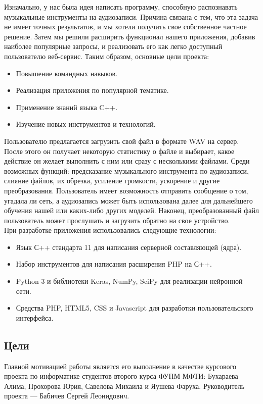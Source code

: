 \documentclass[14pt,a4paper]{article}
\begin{document}
Изначально, у нас была идея написать программу, способную распознавать музыкальные инструменты на аудиозаписи. Причина связана с тем, что эта задача не имеет точных результатов, и мы хотели получить свое собственное частное решение. Затем мы решили расширить функционал нашего приложения, добавив наиболее популярные запросы, и реализовать его как легко доступный пользователю веб-сервис. Таким образом, основные цели проекта:
\begin{itemize}
\item Повышение командных навыков.
\item Реализация приложения по популярной тематике.
\item Применение знаний языка C++.
\item Изучение новых инструментов и технологий.
\end{itemize}

Пользователю предлагается загрузить свой файл в формате WAV на сервер. После этого он получает некоторую статистику о файле и выбирает, какое действие он желает выполнить с ним или сразу с несколькими файлами. Среди возможных функций: предсказание музыкального инструмента по аудиозаписи, слияние файлов, их обрезка, усиление громкости, ускорение и другие преобразования. Пользователь имеет возможность отправить сообщение о том, угадала ли сеть, а аудиозапись может быть использована далее для дальнейшего обучения нашей или каких-либо других моделей. Наконец, преобразованный файл пользователь может прослушать и загрузить обратно на свое устройство.\\

При разработке приложения использовались следующие технологии:
\begin{itemize}
\item Язык С++ стандарта 11 для написания серверной составляющей (ядра).
\item Набор инструментов для написания расширения PHP на С++.
\item Python 3 и библиотеки Keras, NumPy, SciPy для реализации нейронной сети.
\item Средства PHP, HTML5, CSS и Javascript для разработки пользовательского интерфейса.
\end{itemize}

\subsection{Цели}

Главной мотивацией работы является его выполнение в качестве курсового проекта по информатике студентов второго курса ФУПМ МФТИ: Бухараева Алима, Прохорова Юрия, Савелова Михаила и Яушева Фаруха. Руководитель проекта --- Бабичев Сергей Леонидович. \\
\end{document}
